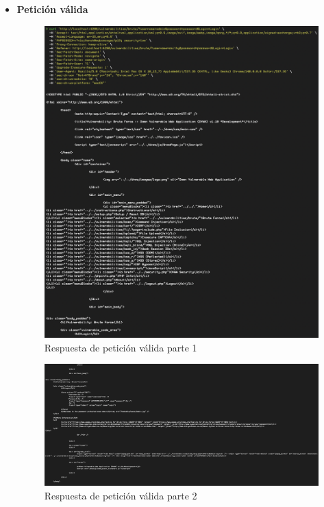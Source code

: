 \documentclass[letter,12pt]{article}
\begin{document}
\begin{itemize}
    \item \textbf{Petición válida}
    \begin{figure}[H]
        \centering
        \includegraphics[width=1\linewidth]{Imagenes/cURL_valid_p1.png}
        \caption{Respuesta de petición válida parte 1}
        \label{fig:placeholder}
    \end{figure}
    \begin{figure}[H]
        \centering
        \includegraphics[width=1\linewidth]{Imagenes/cURL_valid_p2.png}
        \caption{Respuesta de petición válida parte 2}
        \label{fig:placeholder}

\end{figure}
\end{itemize}
\end{document}
